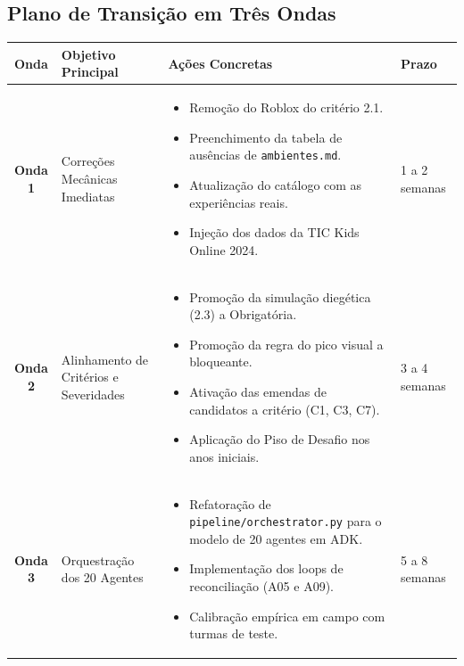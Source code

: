 \documentclass[11pt,a4paper]{article}
\begin{document}
\subsection{Plano de Transi\c{c}\~ao em Tr\^es Ondas}

\begin{center}
\small
\begin{tabularx}{\textwidth}{@{}c p{4.2cm} X l@{}}
\toprule
\textbf{Onda} & \textbf{Objetivo Principal} & \textbf{A\c{c}\~oes Concretas} & \textbf{Prazo} \\
\midrule
\textbf{Onda 1} & Corre\c{c}\~oes Mec\^anicas Imediatas & 
\begin{itemize}[leftmargin=*]
  \item Remo\c{c}\~ao do Roblox do crit\'erio 2.1.
  \item Preenchimento da tabela de aus\^encias de \texttt{ambientes.md}.
  \item Atualiza\c{c}\~ao do cat\'alogo com as experi\^encias reais.
  \item Inje\c{c}\~ao dos dados da TIC Kids Online 2024.
\end{itemize} & 1 a 2 semanas \\
\midrule
\textbf{Onda 2} & Alinhamento de Crit\'erios e Severidades & 
\begin{itemize}[leftmargin=*]
  \item Promo\c{c}\~ao da simula\c{c}\~ao dieg\'etica (2.3) a Obrigat\'oria.
  \item Promo\c{c}\~ao da regra do pico visual a bloqueante.
  \item Ativa\c{c}\~ao das emendas de candidatos a crit\'erio (C1, C3, C7).
  \item Aplica\c{c}\~ao do Piso de Desafio nos anos iniciais.
\end{itemize} & 3 a 4 semanas \\
\midrule
\textbf{Onda 3} & Orquestra\c{c}\~ao dos 20 Agentes & 
\begin{itemize}[leftmargin=*]
  \item Refatora\c{c}\~ao de \texttt{pipeline/orchestrator.py} para o modelo de 20 agentes em ADK.
  \item Implementa\c{c}\~ao dos loops de reconcilia\c{c}\~ao (A05 e A09).
  \item Calibra\c{c}\~ao emp\'irica em campo com turmas de teste.
\end{itemize} & 5 a 8 semanas \\
\bottomrule
\end{tabularx}
\end{center}
\end{document}
